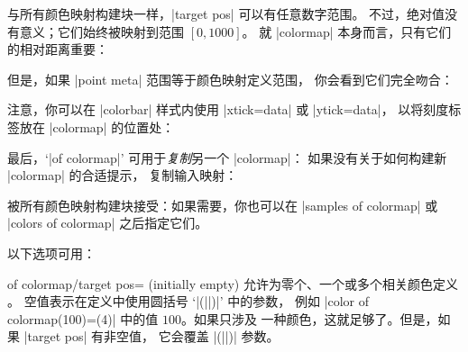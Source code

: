 {\begin{enumerate}
        与所有颜色映射构建块一样，|target pos| 可以有任意数字范围。
        不过，绝对值没有意义；它们始终被映射到范围 $[0,1000]$。
        就 |colormap| 本身而言，只有它们的相对距离重要：
\begin{codeexample}[]
\pgfplotscolorbardrawstandalone[
    colormap={example}{
        of colormap={viridis,
            target pos={-10,-3,0,1,2},
            sample for=const,
        },
    },
    colorbar horizontal,
    colormap access=const]
\end{codeexample}
        但是，如果 |point meta| 范围等于颜色映射定义范围，
        你会看到它们完全吻合：
\begin{codeexample}[]
\pgfplotscolorbardrawstandalone[
    colormap={example}{
        of colormap={viridis,
            target pos={-10,-3,0,1,2},
            sample for=const,
        },
    },
    point meta min=-10,point meta max=2,
    colorbar horizontal,
    colormap access=const]
\end{codeexample}
        注意，你可以在 |colorbar| 样式内使用 |xtick=data| 或 |ytick=data|，
        以将刻度标签放在 |colormap| 的位置处：
\begin{codeexample}[]
\pgfplotscolorbardrawstandalone[
    colormap={example}{
        of colormap={viridis,
            target pos={-10,-3,0,1,2},
            sample for=const,
        },
    },
    point meta min=-10,point meta max=2,
    colorbar horizontal,
    colorbar style={xtick=data},
    colormap access=const]
\end{codeexample}

        最后，`|of colormap|' 可用于\emph{复制}另一个 |colormap|：
        如果没有关于如何构建新 |colormap| 的合适提示，
        \PGFPlots{} 复制输入映射：
\begin{codeexample}[]
\pgfplotscolorbardrawstandalone[
    colormap={example}{
        of colormap={viridis},
    },
    colorbar horizontal,
    colormap access=const]
\end{codeexample}

         被所有颜色映射构建块接受：如果需要，你也可以在
        |samples of colormap| 或 |colors of colormap| 之后指定它们。

        以下选项可用：

        \begin{pgfplotskey}{of colormap/target pos= (initially empty)}
            允许为零个、一个或多个相关颜色定义 。
            空值表示在定义中使用圆括号 `|(||)|' 中的参数，
            例如 |color of colormap(100)=(4)| 中的值 $100$。如果只涉及
            一种颜色，这就足够了。但是，如果 |target pos| 有非空值，
            它会覆盖 |(||)| 参数。


\end{pgfplotskey}
\end{enumerate}}
